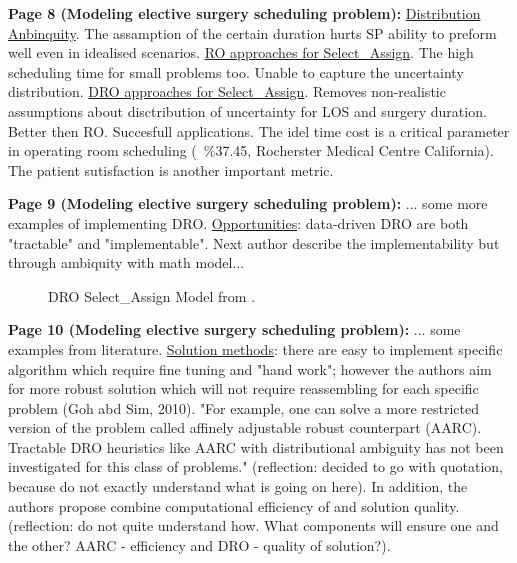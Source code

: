     \textbf{Page 8 (Modeling elective surgery scheduling problem):}
    \underline{Distribution Anbinquity}. The assamption of the certain duration hurts SP ability to preform well even in idealised scenarios. \underline{RO approaches for Select\_Assign}. The high scheduling time for small problems too. Unable to capture the uncertainty distribution. \underline{DRO approaches for Select\_Assign}. Removes non-realistic assumptions about disctribution of uncertainty for LOS and surgery duration. Better then RO. Succesfull applications. The idel time cost is a critical parameter in operating room scheduling (~\%37.45, Rocherster Medical Centre California). The patient sutisfaction is another important metric.

    \textbf{Page 9 (Modeling elective surgery scheduling problem):}
    ... some more examples of implementing DRO. \underline{Opportunities}: data-driven DRO are both "tractable" and "implementable". Next author describe the implementability but through ambiquity with math model...
    \begin{figure}[H]
        \centering
        \caption{DRO Select\_Assign Model from \cite{x335}.}
        \label{fig8:SR0015US22}
    \end{figure}

    \textbf{Page 10 (Modeling elective surgery scheduling problem):}
    ... some examples from literature. \underline{Solution methods}: there are easy to implement specific algorithm which require fine tuning and "hand work"; however the authors aim for more robust solution which will not require reassembling for each specific problem (Goh abd Sim, 2010). "For example, one can solve a more restricted version of the problem called affinely adjustable robust counterpart (AARC). Tractable DRO heuristics like AARC with distributional ambiguity has not been investigated for this class of problems." (reflection: decided to go with quotation, because do not exactly understand what is going on here). In addition, the authors propose combine computational efficiency of and solution quality. (reflection: do not quite understand how. What components will ensure one and the other? AARC - efficiency and DRO - quality of solution?). 
    
